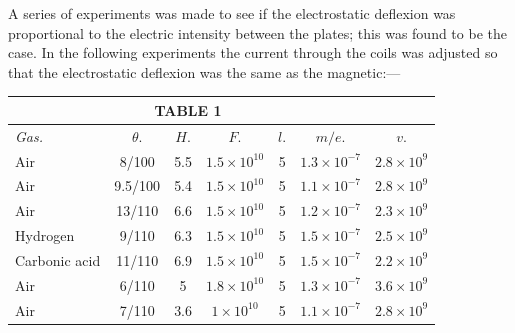 A series of experiments was made to see if the electrostatic deflexion
was proportional to the electric intensity between the plates; this was
found to be the case. In the following experiments the current through
the coils was adjusted so that the electrostatic deflexion was the same
as the magnetic:---
\begin{table}[htp]
\centering
\begin{tabular}{l*{6}{c}} %
\multicolumn{6}{c}{TABLE 1}\\[2pt]
\toprule
\addlinespace[2pt]
\emph{Gas.} & $\theta.$ & $H.$ & $F.$ & $l.$ & $m/e.$ & $v.$\\
\cmidrule(lr){1-1}\cmidrule(lr){2-2}\cmidrule(lr){3-3}\cmidrule(lr){4-4}\cmidrule(lr){5-5}\cmidrule(lr){6-6}\cmidrule(lr){7-7}
\addlinespace[2pt]
Air           & 8/100   & 5.5 & $1.5\!\times\!{10^{10}}$ & 5 & $1.3\!\times\!{10^{-7}}$ & $2.8\!\times\!{10^9}$\\
Air           & 9.5/100 & 5.4 & $1.5\!\times\!{10^{10}}$ & 5 & $1.1\!\times\!{10^{-7}}$ & $2.8\!\times\!{10^9}$\\
Air           & 13/110  & 6.6 & $1.5\!\times\!{10^{10}}$ & 5 & $1.2\!\times\!{10^{-7}}$ & $2.3\!\times\!{10^9}$\\
Hydrogen      & 9/110   & 6.3 & $1.5\!\times\!{10^{10}}$ & 5 & $1.5\!\times\!{10^{-7}}$ & $2.5\!\times\!{10^9}$\\
Carbonic acid & 11/110  & 6.9 & $1.5\!\times\!{10^{10}}$ & 5 & $1.5\!\times\!{10^{-7}}$ & $2.2\!\times\!{10^9}$\\
Air           & 6/110   & 5   & $1.8\!\times\!{10^{10}}$ & 5 & $1.3\!\times\!{10^{-7}}$ & $3.6\!\times\!{10^9}$\\
Air           & 7/110   & 3.6 & $1\!\times\!{10^{10}}$   & 5 & $1.1\!\times\!{10^{-7}}$ & $2.8\!\times\!{10^9}$\\
\bottomrule
\end{tabular}
\end{table}

